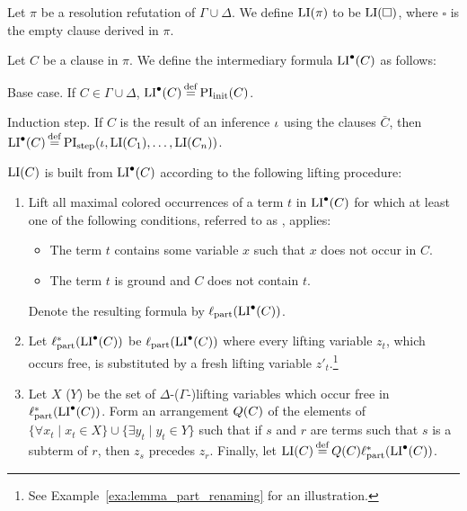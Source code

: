 \begin{defi}
	Let $\pi$ be a resolution refutation of $\Gamma \cup \Delta$.
	We define $\operatorname{LI}(\pi)$ to be $\operatorname{LI}(\square)$, where $\square$ is the empty clause derived in $\pi$.

	Let $C$ be a clause in $\pi$. 
	We define the intermediary formula $\operatorname{LI}^\bullet(C)$ as follows:
	\begin{description}
		\item{} Base case.
			If $C \in \Gamma\cup \Delta$, $\LIpre(C) \defeq \PIinit(C)$.

		\item{} Induction step.
			If $C$ is the result of an inference $\iota$ using the clauses $\bar C$, then $\LIpre(C) \defeq \PIstep(\inference, \LI(C_1), \dots, \LI(C_n))$.

	\end{description}

	\noindent
	$\operatorname{LI}(C)$ is built from $\operatorname{LI}^\bullet(C)$ according to the following lifting procedure:

	\begin{enumerate}
		\item Lift all maximal colored occurrences of a term $t$ in $\operatorname{LI}^\bullet(C)$ for which at least one of the following conditions, referred to as , applies:
			\begin{itemize} 
				\item The term $t$ contains some variable $x$ such that $x$ does not occur in $C$.
				\item The term $t$ is ground and $C$ does not contain $t$.
			\end{itemize} 
			Denote the resulting formula by $\ell_\mathrm{part}(\operatorname{LI}^\bullet(C))$.

		\item 
Let $\ell_\mathrm{part}^*(\operatorname{LI}^\bullet(C))$ be 
$\ell_\mathrm{part}(\operatorname{LI}^\bullet(C))$  where every lifting variable $z_t$, which occurs free, is substituted by a fresh lifting variable $z'_{t}$.\footnote{See Example~\ref{exa:lemma_part_renaming} for an illustration.} 
\label{lemma_part_renaming}

		\item Let $X$ ($Y$) be the set of $\Delta$-($\Gamma$-)lifting variables which occur free in  
			$\ell_\mathrm{part}^*(\operatorname{LI}^\bullet(C))$.
			Form an arrangement $Q(C)$ of the elements of $\{\forall x_t \mid x_t \in X\}\cup\allowbreak\{\exists y_t \mid y_t \in Y\}$ such that if $s$ and $r$ are terms such that $s$ is a subterm of $r$, then $z_s$ precedes\nolinebreak{} $z_r$.
			Finally, let $\LI(C) \defeq Q(C) \lifsym_\mathrm{part}^*(\LIpre(C))$.
			\qedhere
	\end{enumerate}
\end{defi}

